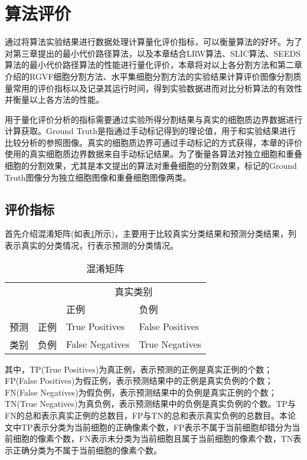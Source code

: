 \documentclass[nomlist,masters]{seuthesix}
\begin{document}
\section{算法评价}
通过将算法实验结果进行数据处理计算量化评价指标，可以衡量算法的好坏。为了对第三章提出的最小代价路径算法，以及本章结合LRW算法、SLIC算法、SEEDS算法的最小代价路径算法的性能进行量化评价，本章将对以上各分割方法和第二章介绍的RGVF细胞分割方法、水平集细胞分割方法的实验结果计算评价图像分割质量常用的评价指标以及记录其运行时间，得到实验数据进而对比分析算法的有效性并衡量以上各方法的性能。

用于量化评价分析的指标需要通过实验所得分割结果与真实的细胞质边界数据进行计算获取。Ground Truth是指通过手动标记得到的理论值，用于和实验结果进行比较分析的参照图像。真实的细胞质边界可通过手动标记的方式获得，本章的评价使用的真实细胞质边界数据来自手动标记结果。为了衡量各算法对独立细胞和重叠细胞的分割效果，尤其是本文提出的算法对重叠细胞的分割效果，标记的Ground Truth图像分为独立细胞图像和重叠细胞图像两类。
\subsection{评价指标}
首先介绍混淆矩阵(如表\ref{confusionM}所示)，主要用于比较真实分类结果和预测分类结果，列表示真实的分类情况，行表示预测的分类情况。

\begin{table}[H]
\centering
\caption{混淆矩阵\label{confusionM}}
\begin{tabular}{|p{2cm}<{\centering}|p{2cm}<{\centering}|p{4cm}<{\centering}|p{4cm}<{\centering}|}
\hline
\multicolumn{2}{|c|}{} & \multicolumn{2}{|c|}{真实类别}\\
\cline{3-4}
\multicolumn{2}{|c|}{}  & 正例 & 负例\\
\hline
预测 & 正例 & True Positives & False Positives\\
\cline{2-4}
类别 & 负例 & False Negatives & True Negatives\\
\hline
\end{tabular}
\end{table}
其中，TP(True Positives)为真正例，表示预测的正例是真实正例的个数；FP(False Positives)为假正例，表示预测结果中的正例是真实负例的个数；FN(False Negatives)为假负例，表示预测结果中的负例是真实正例的个数；TN(True Negatives)为真负例，表示预测结果中的负例是真实负例的个数。TP与FN的总和表示真实正例的总数目，FP与TN的总和表示真实负例的总数目。本论文中TP表示分类为当前细胞的正确像素个数，FP表示不属于当前细胞却错分为当前细胞的像素个数，FN表示未分类为当前细胞且属于当前细胞的像素个数，TN表示正确分类为不属于当前细胞的像素个数。
\end{document}
